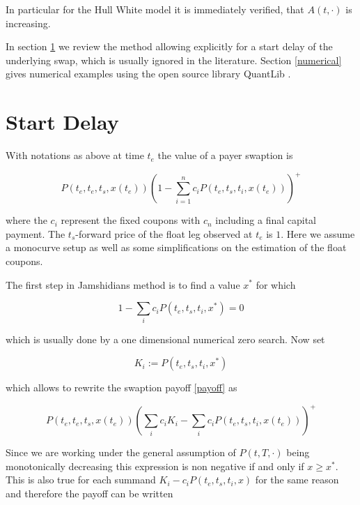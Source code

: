 \documentclass{amsart}
\theoremstyle{plain}
\numberwithin{equation}{section}
\begin{document}
In particular for the Hull White model it is immediately verified, that $A(t,\cdot)$ is increasing.

In section \ref{delay} we review the method allowing explicitly for a start delay of the underlying swap, which is usually ignored in the literature. Section \ref{numerical} gives numerical examples using the open source library QuantLib \cite{ql}. 

\section{Start Delay}\label{delay}

With notations as above at time $t_e$ the value of a payer swaption is

\begin{equation}\label{payoff}
P(t_e,t_e,t_s,x(t_e)) \left( 1 - \sum_{i=1}^n c_i P(t_e,t_s,t_i,x(t_e)) \right)^+
\end{equation}

where the $c_i$ represent the fixed coupons with $c_n$ including a final capital payment. The $t_s$-forward price of the float leg observed at $t_e$ is $1$. Here we assume a monocurve setup as well as some simplifications on the estimation of the float coupons.

The first step in Jamshidians method is to find a value $x^*$ for which

\begin{equation}
1 - \sum_{i} c_i P(t_e,t_s,t_i,x^*) = 0
\end{equation}

which is usually done by a one dimensional numerical zero search. Now set

\begin{equation}\label{strikes}
K_i := P(t_e,t_s,t_i,x^*)
\end{equation}

which allows to rewrite the swaption payoff \ref{payoff} as

\begin{equation}
P(t_e,t_e,t_s,x(t_e)) \left( \sum_i c_i K_i - \sum_i c_i P(t_e,t_s,t_i,x(t_e)) \right)^+
\end{equation}

Since we are working under the general assumption of $P(t,T,\cdot)$ being monotonically decreasing this expression is non negative if and only if $x\geq x^*$. This is also true for each summand $K_i - c_iP(t_e,t_s,t_i,x)$ for the same reason and therefore the payoff can be written
\end{document}
